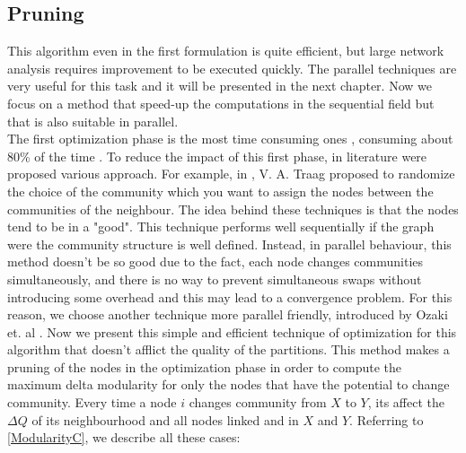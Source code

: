 \subsection{Pruning}
This algorithm even in the first formulation is quite efficient, but large network analysis requires improvement to be executed quickly. The parallel techniques are very useful for this task and it will be presented in the next chapter. Now we focus on a method that speed-up the computations in the sequential field but that is also suitable in parallel.\\
The first optimization phase is the most time consuming ones \cite{Blondel_2008}, consuming about 80\% of the time \cite{wickramaarachchi2014fast}. To reduce the impact of this first phase, in literature were proposed various approach. For example, in \cite{rand}, V. A. Traag proposed to randomize the choice of the community which you want to assign the nodes between the communities of the neighbour. The idea behind these techniques is that the nodes tend to be in a "good". This technique performs well sequentially if the graph were the community structure is well defined. Instead, in parallel behaviour, this method doesn't be so good due to the fact, each node changes communities simultaneously, and there is no way to prevent simultaneous swaps without introducing some overhead and this may lead to a convergence problem. For this reason, we choose another technique more parallel friendly, introduced by Ozaki et. al \cite{pruning}. Now we present this simple and efficient technique of optimization for this algorithm that doesn't afflict the quality of the partitions. This method makes a pruning of the nodes in the optimization phase in order to compute the maximum delta modularity for only the nodes that have the potential to change community.
Every time a node $i$ changes community from $X$ to $Y$, its affect the $\Delta Q$ of its neighbourhood and all nodes linked and in $X$ and $Y$. Referring to \ref{ModularityC}, we describe all these cases:
